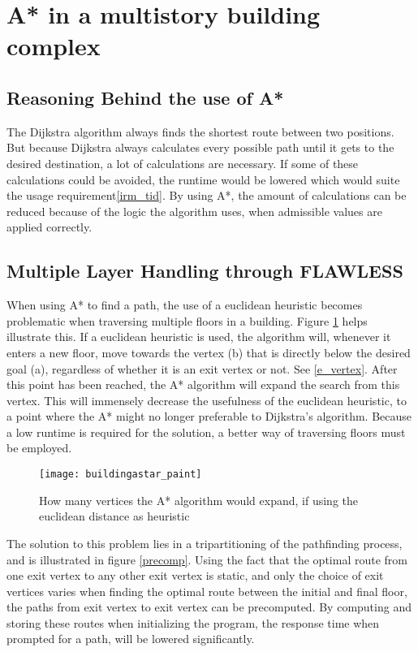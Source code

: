 \section{A* in a multistory building complex}

\subsection{Reasoning Behind the use of A*}
The Dijkstra algorithm always finds the shortest route between two positions. But because Dijkstra always calculates every possible path until it gets to the desired destination, a lot of calculations are necessary. If some of these calculations could be avoided, the runtime would be lowered which would suite the usage requirement\cref{irm_tid}. By using A*, the amount of calculations can be reduced because of the logic the algorithm uses, when admissible values are applied correctly.

\subsection{Multiple Layer Handling through FLAWLESS} \label{multlayhan}

When using A* to find a path, the use of a euclidean heuristic becomes problematic when traversing multiple floors in a building. Figure \ref{fig:buildingAstar} helps illustrate this. If a euclidean heuristic is used, the algorithm will, whenever it enters a new floor, move towards the vertex (b) that is directly below the desired goal (a), regardless of whether it is an exit vertex or not. See \cref{e_vertex}. After this point has been reached, the A* algorithm will expand the search from this vertex. This will immensely decrease the usefulness of the euclidean heuristic, to a point where the A* might no longer preferable to Dijkstra's algorithm. Because a low runtime is required for the solution, a better way of traversing floors must be employed.

\begin{figure}[ht!]
    \centering
    \texttt{[image: buildingastar\_paint]}
    \caption{How many vertices the A* algorithm would expand, if using the euclidean distance as heuristic}
    \label{fig:buildingAstar}
  \end{figure}

The solution to this problem lies in a tripartitioning of the pathfinding process, and is illustrated in figure \ref{precomp}. Using the fact that the optimal route from one exit vertex to any other exit vertex is static, and only the choice of exit vertices varies when finding the optimal route between the initial and final floor, the paths from exit vertex to exit vertex can be precomputed. By computing and storing these routes when initializing the program, the response time when prompted for a path, will be lowered significantly.

